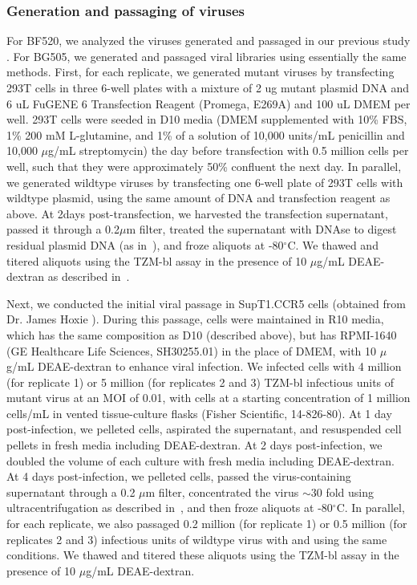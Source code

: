 \documentclass[9pt,lineno]{elife}
\begin{document}
\subsubsection*{Generation and passaging of viruses}
For BF520, we analyzed the viruses generated and passaged in our previous study \cite{dingens2017comprehensive}.
For BG505, we generated and passaged viral libraries using essentially the same methods.
First, for each replicate, we generated mutant viruses by transfecting 293T cells in three 6-well plates with a mixture of 2 ug mutant plasmid DNA and 6 uL FuGENE 6 Transfection Reagent (Promega, E269A) and 100 uL DMEM per well.
293T cells were seeded in D10 media (DMEM supplemented with 10\% FBS, 1\% 200 mM L-glutamine, and 1\% of a solution of 10,000 units/mL penicillin and 10,000 $\mu$g/mL streptomycin) the day before transfection with 0.5 million cells per well, such that they were approximately 50\% confluent the next day.
In parallel, we generated wildtype viruses by transfecting one 6-well plate of 293T cells with wildtype plasmid, using the same amount of DNA and transfection reagent as above.
At 2days post-transfection, we harvested the transfection supernatant, passed it through a 0.2$\mu$m filter, treated the supernatant with DNAse to digest residual plasmid DNA (as in~\cite{haddox2016experimental}), and froze aliquots at -80$^{\circ}$C.
We thawed and titered aliquots using the TZM-bl assay in the presence of 10 $\mu$g/mL DEAE-dextran as described in~\cite{dingens2017comprehensive}.

Next, we conducted the initial viral passage in SupT1.CCR5 cells (obtained from Dr. James Hoxie \cite{boyd2015mutations}).
During this passage, cells were maintained in R10 media, which has the same composition as D10 (described above), but has RPMI-1640 (GE Healthcare Life Sciences, SH30255.01) in the place of DMEM, with 10 $\mu$g/mL DEAE-dextran to enhance viral infection.
We infected cells with 4 million (for replicate 1) or 5 million (for replicates 2 and 3) TZM-bl infectious units of mutant virus at an MOI of 0.01, with cells at a starting concentration of 1 million cells/mL in vented tissue-culture flasks (Fisher Scientific, 14-826-80).
At 1 day post-infection, we pelleted cells, aspirated the supernatant, and resuspended cell pellets in fresh media including DEAE-dextran.
At 2 days post-infection, we doubled the volume of each culture with fresh media including DEAE-dextran.
At 4 days post-infection, we pelleted cells, passed the virus-containing supernatant through a 0.2 $\mu$m filter, concentrated the virus $\sim$30 fold using ultracentrifugation as described in~\cite{dingens2017comprehensive}, and then froze aliquots at -80$^{\circ}$C.
In parallel, for each replicate, we also passaged 0.2 million (for replicate 1) or 0.5 million (for replicates 2 and 3) infectious units of wildtype virus with and using the same conditions.
We thawed and titered these aliquots using the TZM-bl assay in the presence of 10 $\mu$g/mL DEAE-dextran.
\end{document}
